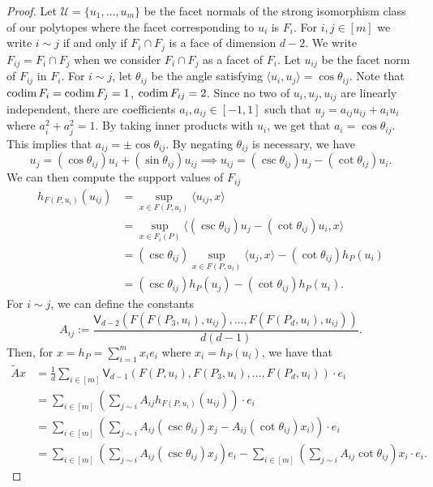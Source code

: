 \documentclass{puthesis-UG}
\begin{document}
\begin{proof}
	Let $\mathcal{U} = \{u_1, \ldots, u_m\}$ be the facet normals of the strong isomorphism class of our polytopes where the facet corresponding to $u_i$ is $F_i$. For $i, j \in [m]$ we write $i \sim j$ if and only if $F_i \cap F_j$ is a face of dimension $d-2$. We write $F_{ij} = F_i \cap F_j$ when we consider $F_i \cap F_j$ as a facet of $F_i$. Let $u_{ij}$ be the facet norm of $F_{ij}$ in $F_i$. For $i \sim j$, let $\theta_{ij}$ be the angle satisfying $\langle u_i, u_j \rangle = \cos \theta_{ij}$. Note that $\operatorname{codim} F_i = \operatorname{codim} F_j = 1$, $\operatorname{codim} F_{ij} = 2$. Since no two of $u_i, u_j, u_{ij}$ are linearly independent, there are coefficients $a_i, a_{ij} \in [-1, 1]$ such that $u_j = a_{ij} u_{ij} + a_i u_i$ where $a_i^2 + a_j^2 = 1$. By taking inner products with $u_i$, we get that $a_i = \cos \theta_{ij}$. This implies that $a_{ij} = \pm \cos \theta_{ij}$. By negating $\theta_{ij}$ is necessary, we have 
	\[
		u_j = (\cos \theta_{ij}) u_i + (\sin \theta_{ij}) u_{ij} \implies u_{ij} = (\csc \theta_{ij}) u_j - (\cot \theta_{ij}) u_i.
	\]
	We can then compute the support values of $F_{ij}$
	\begin{align*}
		h_{F(P, u_i)} (u_{ij}) & = \sup_{x \in F(P, u_i)} \langle u_{ij}, x \rangle \\
		& = \sup_{x \in F_i(P)} \langle (\csc \theta_{ij}) u_j - (\cot \theta_{ij}) u_i, x \rangle \\
		& = (\csc \theta_{ij}) \sup_{x \in F(P, u_i)} \langle u_j, x \rangle - (\cot \theta_{ij}) h_P(u_i) \\
		& = (\csc \theta_{ij}) h_P(u_j) - (\cot \theta_{ij}) h_P(u_i).
	\end{align*}
	For $i \sim j$, we can define the constants
	\[
		A_{ij} := \frac{\mathsf{V}_{d-2}(F(F(P_3, u_i), u_{ij}), \ldots, F(F(P_d, u_i), u_{ij}))}{d(d-1)}.
	\]
	Then, for $x = h_P = \sum_{i = 1}^m x_i e_i$ where $x_i = h_P(u_i)$, we have that 
	\begin{align*}
		\widetilde{A} x & = \frac{1}{d} \sum_{i \in [m]} \mathsf{V}_{d-1} (F(P, u_i), F(P_3, u_i), \ldots, F(P_d, u_i)) \cdot e_i \\
		& = \sum_{i \in [m]}  \left ( \sum_{j \sim i} A_{ij} h_{F(P, u_i)}(u_{ij}) \right ) \cdot e_i \\
		& = \sum_{i \in [m]} \left (  \sum_{j \sim i} A_{ij} (\csc \theta_{ij}) x_j - A_{ij} (\cot \theta_{ij}) x_i) \right ) \cdot e_i \\
		& = \sum_{i \in [m]} \left ( \sum_{j \sim i} A_{ij} (\csc \theta_{ij}) x_j \right ) e_i - \sum_{i \in [m]} \left ( \sum_{j \sim i} A_{ij} \cot \theta_{ij} \right ) x_i \cdot e_i.

\end{align*}
\end{proof}
\end{document}
